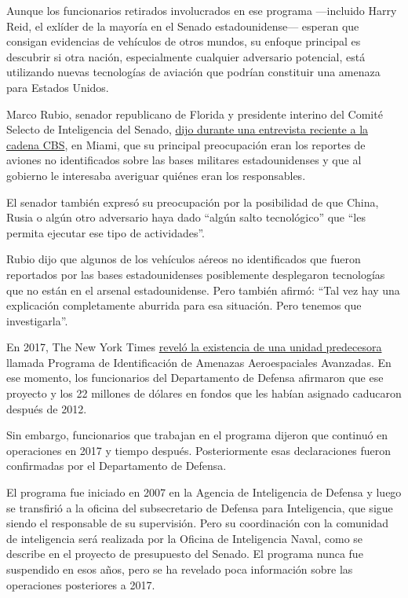 Aunque los funcionarios retirados involucrados en ese programa
---incluido Harry Reid, el exlíder de la mayoría en el Senado
estadounidense--- esperan que consigan evidencias de vehículos de otros
mundos, su enfoque principal es descubrir si otra nación, especialmente
cualquier adversario potencial, está utilizando nuevas tecnologías de
aviación que podrían constituir una amenaza para Estados Unidos.

Marco Rubio, senador republicano de Florida y presidente interino del
Comité Selecto de Inteligencia del Senado,
\href{https://www.youtube.com/watch?v=8AnoX3VV8hI\&fbclid=IwAR21DYnr5sm25TtyaY08P8I6-GKPW8d7T-EMR3c7eCgQKw0HwyvinpQm9IE}{dijo
durante una entrevista reciente a la cadena CBS}, en Miami, que su
principal preocupación eran los reportes de aviones no identificados
sobre las bases militares estadounidenses y que al gobierno le
interesaba averiguar quiénes eran los responsables.

El senador también expresó su preocupación por la posibilidad de que
China, Rusia o algún otro adversario haya dado ``algún salto
tecnológico'' que ``les permita ejecutar ese tipo de actividades''.

Rubio dijo que algunos de los vehículos aéreos no identificados que
fueron reportados por las bases estadounidenses posiblemente desplegaron
tecnologías que no están en el arsenal estadounidense. Pero también
afirmó: ``Tal vez hay una explicación completamente aburrida para esa
situación. Pero tenemos que investigarla''.

En 2017, The New York Times
\href{https://www.nytimes3xbfgragh.onion/es/2017/12/21/espanol/los-ovnis-son-reales-un-programa-del-pentagono-intento-averiguarlo.html}{reveló
la existencia de una unidad predecesora} llamada Programa de
Identificación de Amenazas Aeroespaciales Avanzadas. En ese momento, los
funcionarios del Departamento de Defensa afirmaron que ese proyecto y
los 22 millones de dólares en fondos que les habían asignado caducaron
después de 2012.

Sin embargo, funcionarios que trabajan en el programa dijeron que
continuó en operaciones en 2017 y tiempo después. Posteriormente esas
declaraciones fueron confirmadas por el Departamento de Defensa.

El programa fue iniciado en 2007 en la Agencia de Inteligencia de
Defensa y luego se transfirió a la oficina del subsecretario de Defensa
para Inteligencia, que sigue siendo el responsable de su supervisión.
Pero su coordinación con la comunidad de inteligencia será realizada por
la Oficina de Inteligencia Naval, como se describe en el proyecto de
presupuesto del Senado. El programa nunca fue suspendido en esos años,
pero se ha revelado poca información sobre las operaciones posteriores a
2017.

